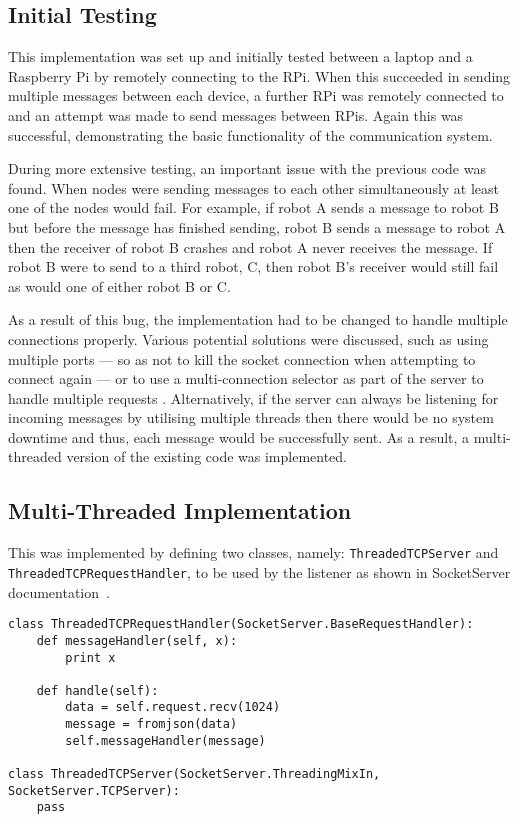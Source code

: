 \subsection{Initial Testing}\label{soft/comms/initest}
This implementation was set up and initially tested between a laptop and a 
Raspberry Pi by remotely connecting to the RPi. When this succeeded in sending
multiple messages between each device, a further RPi was remotely connected to and
an attempt was made to send messages between RPis. Again this was successful, 
demonstrating the basic functionality of the communication system.

During more extensive testing, an important issue with the previous
code was found. When nodes were sending messages to each other simultaneously
at least one of the nodes would fail. For example, if robot A sends a message to
robot B but before the message has finished sending, robot B sends a message to
robot A then the receiver of robot B crashes and robot A never receives the message.
If robot B were to send to a third robot, C, then robot B's receiver would still
fail as would one of either robot B or C.

As a result of this bug, the implementation had to be changed to handle
multiple connections properly. Various potential solutions were discussed,
such as using multiple ports --- so as not to kill the socket connection when
attempting to connect again --- or to use a multi-connection selector as part of
the server to handle multiple requests \cite{multiconnectionServer}.
Alternatively, if the server can always be listening for incoming messages by
utilising multiple threads then there would be no system downtime and
thus, each message would be successfully sent. As a result, a multi-threaded version
of the existing code was implemented.


\subsection{Multi-Threaded Implementation}\label{soft/comms/mtimpl}

This was implemented by defining two classes, namely: \verb|ThreadedTCPServer| and
\verb|ThreadedTCPRequestHandler|, to be used by the listener as shown in 
SocketServer documentation~\cite{socketServerDocs}.

\begin{lstlisting}
class ThreadedTCPRequestHandler(SocketServer.BaseRequestHandler):
    def messageHandler(self, x):
        print x

    def handle(self):
        data = self.request.recv(1024)
        message = fromjson(data)
        self.messageHandler(message)

class ThreadedTCPServer(SocketServer.ThreadingMixIn, SocketServer.TCPServer):
    pass
\end{lstlisting}

